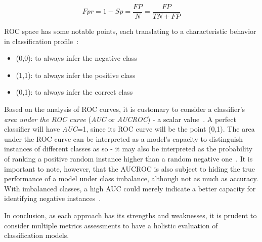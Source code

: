 \begin{equation}
    Fpr = 1 - Sp = \frac{FP}{N} = \frac{FP}{TN+FP}
\end{equation}

ROC space has some notable points, each translating to a characteristic behavior in classification profile~\cite{Fawcett2006}:
\begin{itemize}
    \item (0,0): to always infer the negative class
    \item (1,1): to always infer the positive class
    \item (0,1): to always infer the correct class
\end{itemize}


Based on the analysis of ROC curves, it is customary to consider a classifier's \textit{area under the ROC curve} (\textit{AUC} or \textit{AUCROC}) - a scalar value~\cite{Fawcett2006}.
A perfect classifier will have \textit{AUC}=1, since its ROC curve will be the point (0,1).
The area under the ROC curve can be interpreted as a model's capacity to distinguish instances of different classes as so - it may also be interpreted as the probability of ranking a positive random instance higher than a random negative one~\cite{Fawcett2006}.
It is important to note, however, that the AUCROC is also subject to hiding the true performance of a model under class imbalance, although not as much as accuracy.
With imbalanced classes, a high AUC could merely indicate a better capacity for identifying negative instances~\cite{Burke2019}.

In conclusion, as each approach has its strengths and weaknesses, it is prudent to consider multiple metrics assessments to have a holistic evaluation of classification models.

